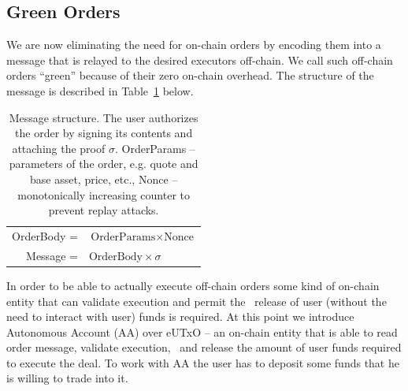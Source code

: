 \documentclass[11pt]{article}
\begin{document}
\begin{sloppypar}
        \subsection{Green Orders}\label{subsec:off-chain-orders}
        We are now eliminating the need for on-chain orders by encoding them into a message that is relayed to the desired executors off-chain.
        We call such off-chain orders \enquote{green} because of their zero on-chain overhead.
        The structure of the message is described in Table~\ref{tab:table} below.

        \begin{table}[h]
            \begin{center}
                \begin{tabular}{ | r l | }
                    \hline
                    OrderBody = & $\text{OrderParams} \times \text{Nonce}$ \\
                    Message =   & $\text{OrderBody} \times \sigma$         \\
                    \hline
                \end{tabular}
            \end{center}
            \caption{Message structure. The user authorizes the order by signing its contents and attaching the proof $\sigma$.
            OrderParams -- parameters of the order, e.g. quote and base asset, price, etc., Nonce -- monotonically increasing counter to prevent replay attacks.}
            \label{tab:table}
        \end{table}

        In order to be able to actually execute off-chain orders some kind of on-chain entity that can validate execution and permit the \
        release of user (without the need to interact with user) funds is required.
        At this point we introduce Autonomous Account (AA) over eUTxO -- an on-chain entity that is able to read order message, validate execution, \
        and release the amount of user funds required to execute the deal.
        To work with AA the user has to deposit some funds that he is willing to trade into it.


\end{sloppypar}
\end{document}
